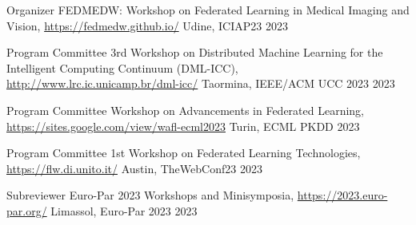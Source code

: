



\begin{cvhonors}

  \cvhonor
    {Organizer} %
    {FEDMEDW: Workshop on Federated Learning in Medical Imaging and Vision, \url{https://fedmedw.github.io/}} %
    {Udine, ICIAP23} %
    {2023} %

\end{cvhonors}




\begin{cvhonors}

  \cvhonor
    {Program Committee} %
    {3rd Workshop on Distributed Machine Learning for the Intelligent Computing Continuum (DML-ICC), \url{http://www.lrc.ic.unicamp.br/dml-icc/}} %
    {Taormina, IEEE/ACM UCC 2023} %
    {2023} %


  \cvhonor
    {Program Committee} %
    {Workshop on Advancements in Federated Learning, \url{https://sites.google.com/view/wafl-ecml2023}} %
    {Turin, ECML PKDD} %
    {2023} %

  \cvhonor
    {Program Committee} %
    {1st Workshop on Federated Learning Technologies, \url{https://flw.di.unito.it/}} %
    {Austin, TheWebConf23} %
    {2023} %

  \cvhonor
    {Subreviewer} %
    {Euro-Par 2023 Workshops and Minisymposia, \url{https://2023.euro-par.org/}} %
    {Limassol, Euro-Par 2023} %
    {2023} %

\end{cvhonors}

